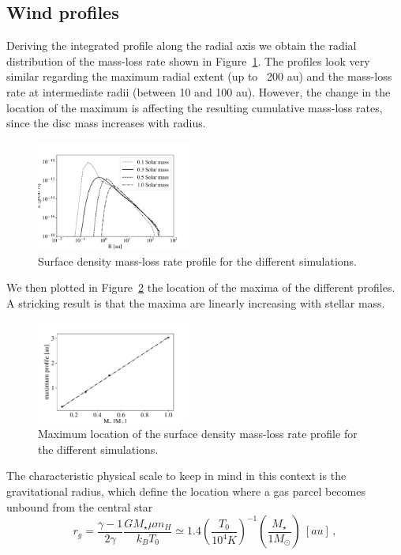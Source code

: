 \documentclass{aa}
\begin{document}
\subsection{Wind profiles}\label{sec:wind-prof}
Deriving the integrated profile along the radial axis we obtain the radial distribution of the mass-loss rate shown in Figure~\ref{fig:Sigmadot}. The profiles look very similar regarding the maximum radial extent (up to ~200 au) and the mass-loss rate at intermediate radii (between 10 and 100 au). However, the change in the location of the maximum is affecting the resulting cumulative mass-loss rates, since the disc mass increases with radius.
\begin{figure}
  \centering
  \includegraphics[width=0.45\textwidth]{Surfprofile}
  \caption{Surface density mass-loss rate profile for the different simulations. \label{fig:Sigmadot}}
\end{figure}
We then plotted in Figure~\ref{fig:maxProf} the location of the maxima of the different profiles. A stricking result is that the maxima are linearly increasing with stellar mass.
\begin{figure}
    \centering
    \includegraphics[width=0.45\textwidth]{maxProf}
    \caption{Maximum location of the surface density mass-loss rate profile for the different simulations. \label{fig:maxProf}}
\end{figure}
The characteristic physical scale to keep in mind in this context is the gravitational radius, which define the location where a gas parcel becomes unbound from the central star 
\begin{equation}\label{eq:rg}
  r_g = \frac{\gamma-1}{2\gamma} \frac{GM_\star\mu m_H}{k_B T_0} \simeq 1.4 \left(\frac{T_0}{10^4 K}\right)^{-1} \left(\frac{M_\star}{1 M_\odot}\right) \ [au]\,,
\end{equation}
\end{document}
